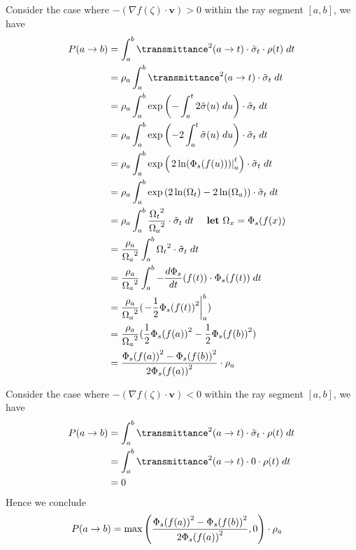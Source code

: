 Consider the case where $-(\nabla f(\zeta)\cdot \mathbf{v})>0$ within the ray segment $[a,b]$, we have
\begin{align}
P(a \rightarrow b)
&= \int_a^b \transmittance^2(a\rightarrow t) \cdot \tilde{\density}_t \cdot \reflectivity(t)  \; dt
\\
&= \reflectivity_a \int_a^b \transmittance^2(a\rightarrow t) \cdot \tilde{\density}_t \; dt
\\
&= \reflectivity_a \int_a^b \exponential{-\int_a^t 2\tilde{\density}(u) \; du} \cdot \tilde{\density}_t \; dt
\\
&= \reflectivity_a \int_a^b \exponential{-2\int_a^t \tilde{\density}(u) \; du} \cdot \tilde{\density}_t \; dt
\\
&= \reflectivity_a \int_a^b \exponential{\left. 2\ln(\Phi_s(f(u)))\right|_a^t} \cdot \tilde{\density}_t \; dt
\\
&= \reflectivity_a \int_a^b \exponential{2\ln(\Omega_t) - 2\ln(\Omega_a)} \cdot \tilde{\density}_t \; dt 
\\
&= \reflectivity_a \int_a^b \frac{{\Omega_t}^2}{{\Omega_a}^2} \cdot \tilde{\density}_t \; dt ~~~~\text{\textbf{let} $\Omega_x = \Phi_s(f(x))$}
\\
&= \frac{\reflectivity_a}{{\Omega_a}^2} \int_a^b {\Omega_t}^2 \cdot \tilde{\density}_t \; dt 
\\
&= \frac{\reflectivity_a}{{\Omega_a}^2} \int_a^b -\frac{d\Phi_s}{dt}(f(t)) \cdot \Phi_s(f(t)) \; dt 
\\
&= \frac{\reflectivity_a}{{\Omega_a}^2} ( \left. -\frac{1}{2}{\Phi_s(f(t))}^2 \right|_a^b) \\
&= \frac{\reflectivity_a}{{\Omega_a}^2} (\frac{1}{2}{\Phi_s(f(a))}^2 -\frac{1}{2}{\Phi_s(f(b))}^2 )\\
&= \frac{{\Phi_s(f(a))}^2 -{\Phi_s(f(b))}^2}{{2\Phi_s(f(a))}^2} \cdot \reflectivity_a 
\label{eq:homogeneous}
\end{align}

Consider the case where $-(\nabla f(\zeta)\cdot \mathbf{v})<0$ within the ray segment $[a,b]$, we have
\begin{align}
P(a \rightarrow b)
&= \int_a^b \transmittance^2(a\rightarrow t) \cdot \tilde{\density}_t \cdot \reflectivity(t)  \; dt
\\
&= \int_a^b \transmittance^2(a\rightarrow t) \cdot 0 \cdot \reflectivity(t)  \; dt
\\
&= 0
\end{align}
Hence we conclude 
\begin{align}
P(a \rightarrow b)
&= \max\left(\frac{{\Phi_s(f(a))}^2 -{\Phi_s(f(b))}^2}{{2\Phi_s(f(a))}^2},0\right) \cdot \rho_a 
\end{align}

